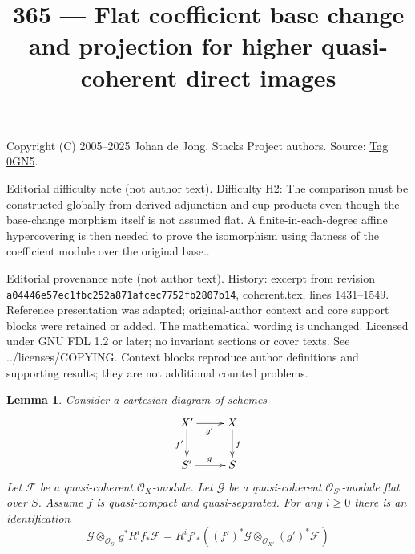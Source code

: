 \documentclass{amsart}
\theoremstyle{plain}
\newtheorem{lemma}[subsection]{Lemma}
\theoremstyle{definition}
\theoremstyle{remark}
\numberwithin{equation}{subsection}
\begin{document}
\title[Stacks Project, Tag 0GN5]{365 --- Flat coefficient base change and projection for higher quasi-coherent direct images}
\maketitle
\noindent Copyright (C) 2005--2025 Johan de Jong. Stacks Project authors. Source: \href{https://stacks.math.columbia.edu/tag/0GN5}{Tag 0GN5}.

\noindent Editorial difficulty note (not author text). Difficulty H2: The comparison must be constructed globally from derived adjunction and cup products even though the base-change morphism itself is not assumed flat. A finite-in-each-degree affine hypercovering is then needed to prove the isomorphism using flatness of the coefficient module over the original base..

\noindent Editorial provenance note (not author text). History: excerpt from revision \texttt{a0444\allowbreak 6e57e\allowbreak c1fbc\allowbreak 252a8\allowbreak 71afc\allowbreak ec775\allowbreak 2fb28\allowbreak 07b14}, coherent.tex, lines 1431--1549. Reference presentation was adapted; original-author context and core support blocks were retained or added. The mathematical wording is unchanged. Licensed under GNU FDL 1.2 or later; no invariant sections or cover texts. See ../licenses/COPYING. Context blocks reproduce author definitions and supporting results; they are not additional counted problems.

\begin{lemma}
\label{lemma-base-change-tensor-with-flat}
Consider a cartesian diagram of schemes
$$
\xymatrix{
X' \ar[d]_{f'} \ar[r]_{g'} & X \ar[d]^f \\
S' \ar[r]^g & S
}
$$
Let $\mathcal{F}$ be a quasi-coherent $\mathcal{O}_X$-module.
Let $\mathcal{G}$ be a quasi-coherent $\mathcal{O}_{S'}$-module
flat over $S$. Assume $f$ is quasi-compact and quasi-separated.
For any $i \geq 0$ there is an identification
$$
\mathcal{G} \otimes_{\mathcal{O}_{S'}} g^*R^if_*\mathcal{F} =
R^if'_*\left((f')^*\mathcal{G}
\otimes_{\mathcal{O}_{X'}} (g')^*\mathcal{F}\right)
$$
\end{lemma}
\end{document}
